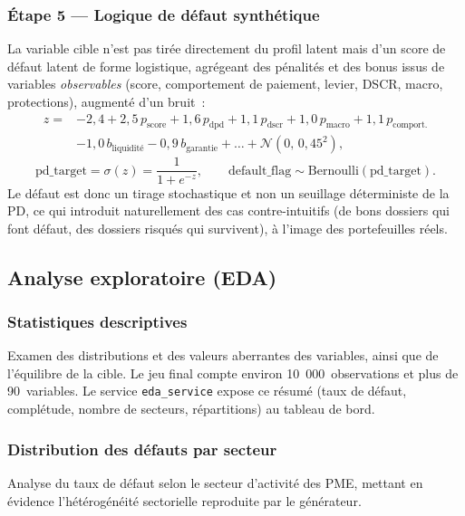 \documentclass[a4paper,12pt,oneside]{report}
\begin{document}
\subsubsection{Étape 5 --- Logique de défaut synthétique}

La variable cible n'est pas tirée directement du profil latent mais d'un score de défaut
latent de forme logistique, agrégeant des pénalités et des bonus issus de variables
\emph{observables} (score, comportement de paiement, levier, DSCR, macro, protections), augmenté
d'un bruit~:
\[
\begin{aligned}
z ={} & -2{,}4
        + 2{,}5\,p_{\text{score}}
        + 1{,}6\,p_{\text{dpd}}
        + 1{,}1\,p_{\text{dscr}}
        + 1{,}0\,p_{\text{macro}}
        + 1{,}1\,p_{\text{comport.}} \\
      & - 1{,}0\,b_{\text{liquidité}}
        - 0{,}9\,b_{\text{garantie}}
        + \dots
        + \mathcal{N}(0,\,0{,}45^2),
\end{aligned}
\]
\[
\text{pd\_target} = \sigma(z) = \frac{1}{1+e^{-z}},
\qquad
\text{default\_flag} \sim \mathrm{Bernoulli}(\text{pd\_target}).
\]
Le défaut est donc un tirage stochastique et non un seuillage déterministe de la PD,
ce qui introduit naturellement des cas contre-intuitifs (de bons dossiers qui font défaut, des
dossiers risqués qui survivent), à l'image des portefeuilles réels.

\subsection{Analyse exploratoire (EDA)}

\subsubsection{Statistiques descriptives}

Examen des distributions et des valeurs aberrantes des variables, ainsi que de l'équilibre de
la cible. Le jeu final compte environ 10~000~observations et plus de 90~variables.
Le service \texttt{eda\_service} expose ce résumé (taux de défaut, complétude, nombre de
secteurs, répartitions) au tableau de bord.

\subsubsection{Distribution des défauts par secteur}

Analyse du taux de défaut selon le secteur d'activité des PME, mettant en évidence
l'hétérogénéité sectorielle reproduite par le générateur.
\end{document}

